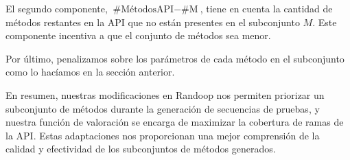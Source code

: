 El segundo componente, $\text{{\#MétodosAPI}} - \text{{\#M}}$, tiene en cuenta la cantidad de métodos restantes en la API que no están presentes en el subconjunto $M$. Este componente incentiva a que el conjunto de métodos sea menor.

Por último, penalizamos sobre los parámetros de cada método en el subconjunto como lo hacíamos en la sección anterior.

En resumen, nuestras modificaciones en Randoop nos permiten priorizar un subconjunto de métodos durante la generación de secuencias de pruebas, y nuestra función de valoración se encarga de maximizar la cobertura de ramas de la API. Estas adaptaciones nos proporcionan una mejor comprensión de la calidad y efectividad de los subconjuntos de métodos generados.

